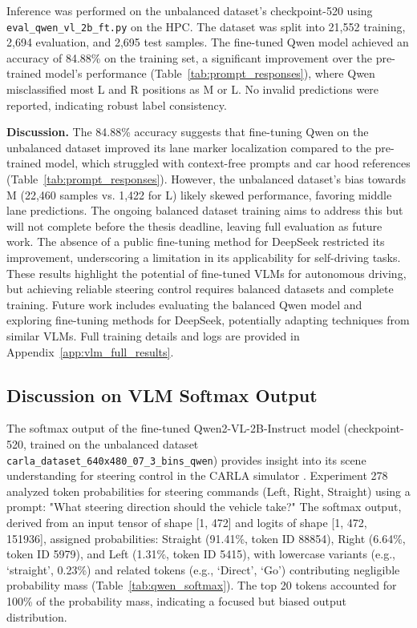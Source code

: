 Inference was performed on the unbalanced dataset’s checkpoint-520 using \texttt{eval\_qwen\_vl\_2b\_ft.py} on the HPC. The dataset was split into 21,552 training, 2,694 evaluation, and 2,695 test samples. The fine-tuned Qwen model achieved an accuracy of 84.88\% on the training set, a significant improvement over the pre-trained model’s performance (Table~\ref{tab:prompt_responses}), where Qwen misclassified most L and R positions as M or L. No invalid predictions were reported, indicating robust label consistency.

\textbf{Discussion.} The 84.88\% accuracy suggests that fine-tuning Qwen on the unbalanced dataset improved its lane marker localization compared to the pre-trained model, which struggled with context-free prompts and car hood references (Table~\ref{tab:prompt_responses}). However, the unbalanced dataset’s bias towards M (22,460 samples vs. 1,422 for L) likely skewed performance, favoring middle lane predictions. The ongoing balanced dataset training aims to address this but will not complete before the thesis deadline, leaving full evaluation as future work. The absence of a public fine-tuning method for DeepSeek restricted its improvement, underscoring a limitation in its applicability for self-driving tasks. These results highlight the potential of fine-tuned VLMs for autonomous driving, but achieving reliable steering control requires balanced datasets and complete training. Future work includes evaluating the balanced Qwen model and exploring fine-tuning methods for DeepSeek, potentially adapting techniques from similar VLMs. Full training details and logs are provided in Appendix~\ref{app:vlm_full_results}.


\subsection{Discussion on VLM Softmax Output}
\label{subsec:vlm_softmax}

The softmax output of the fine-tuned Qwen2-VL-2B-Instruct model (checkpoint-520, trained on the unbalanced dataset \texttt{carla\_dataset\_640x480\_07\_3\_bins\_qwen}) provides insight into its scene understanding for steering control in the CARLA simulator \cite{carla}. Experiment 278 analyzed token probabilities for steering commands (Left, Right, Straight) using a prompt: "What steering direction should the vehicle take?" The softmax output, derived from an input tensor of shape [1, 472] and logits of shape [1, 472, 151936], assigned probabilities: Straight (91.41\%, token ID 88854), Right (6.64\%, token ID 5979), and Left (1.31\%, token ID 5415), with lowercase variants (e.g., `straight', 0.23\%) and related tokens (e.g., `Direct', `Go') contributing negligible probability mass (Table~\ref{tab:qwen_softmax}). The top 20 tokens accounted for 100\% of the probability mass, indicating a focused but biased output distribution.

